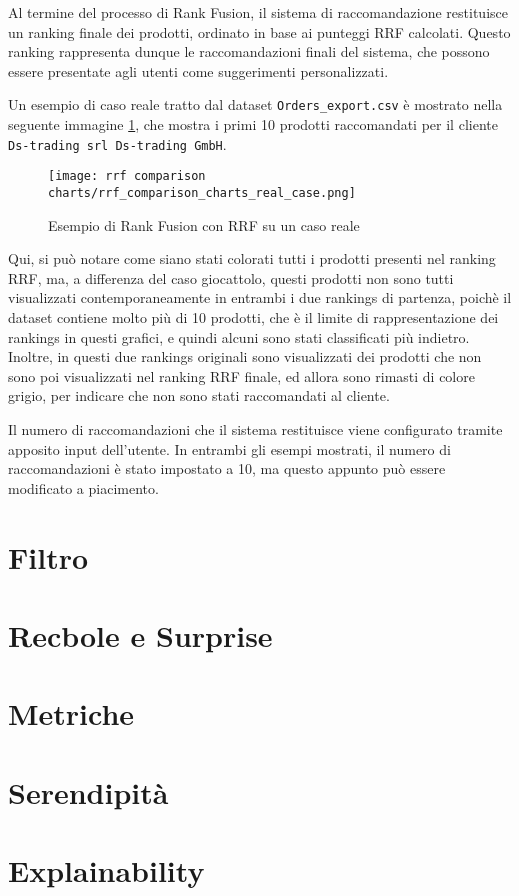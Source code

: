 Al termine del processo di Rank Fusion, il sistema di raccomandazione restituisce un ranking finale dei prodotti, ordinato in base ai punteggi RRF calcolati. Questo ranking rappresenta dunque le raccomandazioni finali del sistema, che possono essere presentate agli utenti come suggerimenti personalizzati.

Un esempio di caso reale tratto dal dataset \texttt{Orders\_export.csv} è mostrato nella seguente immagine \ref{fig:rank-fusion-real-case}, che mostra i primi 10 prodotti raccomandati per il cliente \texttt{Ds-trading srl Ds-trading GmbH}.

\begin{figure}[h]
    \centering
    \texttt{[image: rrf comparison charts/rrf\_comparison\_charts\_real\_case.png]}
    \caption{Esempio di Rank Fusion con RRF su un caso reale}
    \label{fig:rank-fusion-real-case}
\end{figure}

Qui, si può notare come siano stati colorati tutti i prodotti presenti nel ranking RRF, ma, a differenza del caso giocattolo, questi prodotti non sono tutti visualizzati contemporaneamente in entrambi i due rankings di partenza, poichè il dataset contiene molto più di 10 prodotti, che è il limite di rappresentazione dei rankings in questi grafici, e quindi alcuni sono stati classificati più indietro. Inoltre, in questi due rankings originali sono visualizzati dei prodotti che non sono poi visualizzati nel ranking RRF finale, ed allora sono rimasti di colore grigio, per indicare che non sono stati raccomandati al cliente.

Il numero di raccomandazioni che il sistema restituisce viene configurato tramite apposito input dell'utente. In entrambi gli esempi mostrati, il numero di raccomandazioni è stato impostato a 10, ma questo appunto può essere modificato a piacimento.


\section{Filtro}

\section{Recbole e Surprise}

\section{Metriche}

\section{Serendipità}

\section{Explainability}
